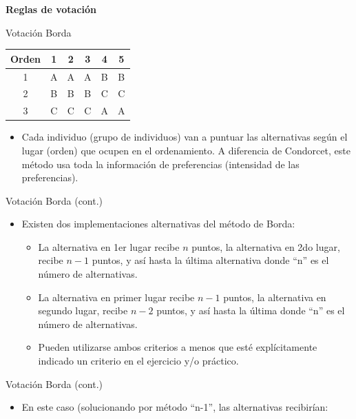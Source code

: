 \documentclass[
  ignorenonframetext,
]{beamer}
\providecommand{\tightlist}{%
  \setlength{\itemsep}{0pt}\setlength{\parskip}{0pt}}\usepackage{longtable,booktabs,array}
\begin{document}
\begin{frame}{\textbf{Reglas de votación}}
\begin{block}{Votación Borda}
\hypertarget{tab:tab2}{}
\begin{longtable}[]{@{}cccccc@{}}
\toprule()
Orden & 1 & 2 & 3 & 4 & 5 \\
\midrule()
\endhead
1 & A & A & A & B & B \\
2 & B & B & B & C & C \\
3 & C & C & C & A & A \\
\bottomrule()
\end{longtable}

\begin{itemize}
\tightlist
\item
  Cada individuo (grupo de individuos) van a puntuar las alternativas
  según el lugar (orden) que ocupen en el ordenamiento. A diferencia de
  Condorcet, este método usa toda la información de preferencias
  (intensidad de las preferencias).
\end{itemize}
\end{block}

\begin{block}{Votación Borda (cont.)}
\protect\hypertarget{votaciuxf3n-borda-cont.}{}
\begin{itemize}
\tightlist
\item
  Existen dos implementaciones alternativas del método de Borda:

  \begin{itemize}
  \tightlist
  \item
    La alternativa en 1er lugar recibe \(n\) puntos, la alternativa en
    2do lugar, recibe \(n-1\) puntos, y así hasta la última alternativa
    donde ``n'' es el número de alternativas.
  \item
    La alternativa en primer lugar recibe \(n-1\) puntos, la alternativa
    en segundo lugar, recibe \(n-2\) puntos, y así hasta la última donde
    ``n'' es el número de alternativas.
  \item
    Pueden utilizarse ambos criterios a menos que esté explícitamente
    indicado un criterio en el ejercicio y/o práctico.
  \end{itemize}
\end{itemize}
\end{block}

\begin{block}{Votación Borda (cont.)}
\protect\hypertarget{votaciuxf3n-borda-cont.-1}{}
\begin{itemize}
\tightlist
\item
  En este caso (solucionando por método ``n-1'', las alternativas
  recibirían:


\end{itemize}
\end{block}
\end{frame}
\end{document}

